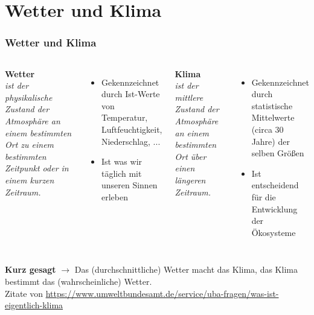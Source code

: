 \section{Wetter und Klima}

\begin{frame}
	\frametitle{Wetter und Klima}
\begin{columns}
	\textbf{Wetter}\\
	\textit{\glqq ist der physikalische Zustand der Atmosphäre an einem bestimmten Ort zu einem \alert{bestimmten Zeitpunkt} oder in einem kurzen Zeitraum.\grqq}
	\begin{itemize}
		\small
		\item Gekennzeichnet durch Ist-Werte von Temperatur, Luftfeuchtigkeit, Niederschlag, ...
		\item Ist was wir täglich mit unseren Sinnen erleben
	\end{itemize}
	\textbf{Klima}\\
	\textit{\glqq ist der mittlere Zustand der Atmosphäre an einem bestimmten Ort über einen \alert{längeren Zeitraum.}\grqq}
	\begin{itemize}
		\small
		\item Gekennzeichnet durch statistische Mittelwerte (circa 30 Jahre) der selben Größen
		\item Ist entscheidend für die Entwicklung der Ökosysteme
	\end{itemize}

\end{columns}
	\textbf{Kurz gesagt} $\rightarrow$ Das (durchschnittliche) Wetter macht das Klima, das Klima bestimmt das (wahrscheinliche) Wetter.\\
	\vspace*{1em}
	\tiny{Zitate von \url{https://www.umweltbundesamt.de/service/uba-fragen/was-ist-eigentlich-klima}}
\end{frame}
